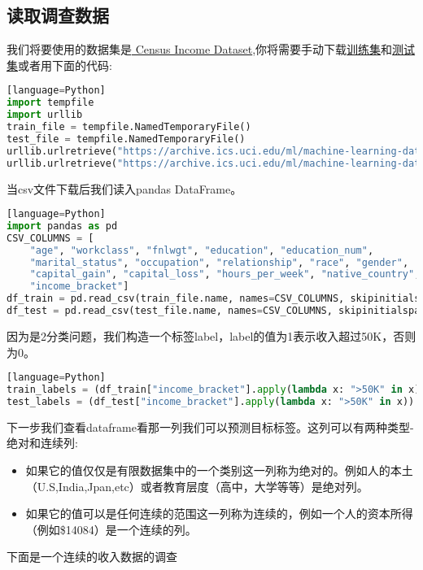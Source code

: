 \subsection{读取调查数据}
我们将要使用的数据集是\href{https://archive.ics.uci.edu/ml/datasets/Census+Income}{ Census Income Dataset},你将需要手动下载\href{https://archive.ics.uci.edu/ml/machine-learning-databases/adult/adult.data}{训练集}和\href{https://archive.ics.uci.edu/ml/machine-learning-databases/adult/adult.test}{测试集}或者用下面的代码:
\begin{lstlisting}[language=Python][language=Python]
import tempfile
import urllib
train_file = tempfile.NamedTemporaryFile()
test_file = tempfile.NamedTemporaryFile()
urllib.urlretrieve("https://archive.ics.uci.edu/ml/machine-learning-databases/adult/adult.data", train_file.name)
urllib.urlretrieve("https://archive.ics.uci.edu/ml/machine-learning-databases/adult/adult.test", test_file.name)
\end{lstlisting}
当csv文件下载后我们读入pandas DataFrame。
\begin{lstlisting}[language=Python][language=Python]
import pandas as pd
CSV_COLUMNS = [
    "age", "workclass", "fnlwgt", "education", "education_num",
    "marital_status", "occupation", "relationship", "race", "gender",
    "capital_gain", "capital_loss", "hours_per_week", "native_country",
    "income_bracket"]
df_train = pd.read_csv(train_file.name, names=CSV_COLUMNS, skipinitialspace=True)
df_test = pd.read_csv(test_file.name, names=CSV_COLUMNS, skipinitialspace=True, skiprows=1)
\end{lstlisting}
因为是2分类问题，我们构造一个标签label，label的值为1表示收入超过50K，否则为0。
\begin{lstlisting}[language=Python][language=Python]
train_labels = (df_train["income_bracket"].apply(lambda x: ">50K" in x)).astype(int)
test_labels = (df_test["income_bracket"].apply(lambda x: ">50K" in x)).astype(int)
\end{lstlisting}
下一步我们查看dataframe看那一列我们可以预测目标标签。这列可以有两种类型-绝对和连续列:
\begin{itemize}
  \item 如果它的值仅仅是有限数据集中的一个类别这一列称为绝对的。例如人的本土（U.S,India,Jpan,etc）或者教育层度（高中，大学等等）是绝对列。
  \item 如果它的值可以是任何连续的范围这一列称为连续的，例如一个人的资本所得（例如\$14084）是一个连续的列。
\end{itemize}
下面是一个连续的收入数据的调查
